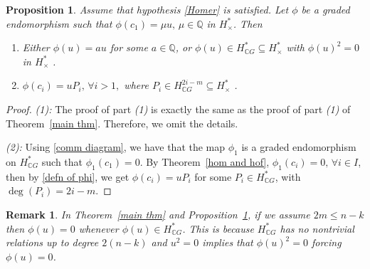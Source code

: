\documentclass{amsart}
\newtheorem{proposition}[theorem]{Proposition}
\newtheorem{remark}[theorem]{Remark}
\newcommand{\thmref}[1]{Theorem~\ref{#1}}
\newcommand{\propref}[1]{Proposition~\ref{#1}}
\begin{document}
	
	\begin{proposition}\label{main thm 2}
		Assume %
that hypothesis \eqref{Homer} is satisfied.
		Let $\phi$ be a graded endomorphism such that $\phi(c_1)=\mu u,\, \mu \in \mathbb{Q}$ in $H^*_{\times}$. %
Then
		\begin{enumerate}
			\item Either %
$\phi(u)=a u$ for some $a \in \mathbb{Q}$, or $\phi(u) \in H^*_{\mathbb{C}G} \subseteq H^*_{\times}$ with $\phi(u)^2=0$ in $H^*_{\times}$%
.
			\item  $\phi(c_i) = uP_i, \, \forall i >1,$ %
where $P_i \in H^{2i-m}_{\mathbb CG}\subseteq H^*_\times$%
. 
		\end{enumerate}
	\end{proposition}
	\begin{proof} \textit{(1):} The %
proof of %
part \textit{(1)} is %
exactly the same as the proof of %
part \textit{(1)} of %
\thmref{main thm}. Therefore, we omit the %
details.
		
		\textit{(2):} Using %
\eqref{comm diagram}, we have that the map $\phi_1$ is a graded endomorphism on $H^*_{\mathbb{C}G}$ such that $\phi_1(c_1) =0$. By \thmref{hom and hof}, $\phi_1(c_i) =0, \, \forall i\in I$, then by \eqref{defn of phi}, we get $\phi(c_i) = uP_i$ for some $P_i \in H^*_{\mathbb{C}G}$, with $\deg(P_i) = 2i - m$. \end{proof}
	\begin{remark}
		In \thmref{main thm} and \propref{main thm 2}, if we assume $2m \leq n-k$  then $\phi(u)=0$ whenever $\phi(u) \in H^*_{\mathbb{C}G}$. This is because $H^*_{\mathbb{C}G}$ has no nontrivial relations up to degree $2(n-k)$ and $u^2=0$ implies that $\phi(u)^2=0$ forcing $\phi(u)=0$.
		
	\end{remark}
\end{document}
